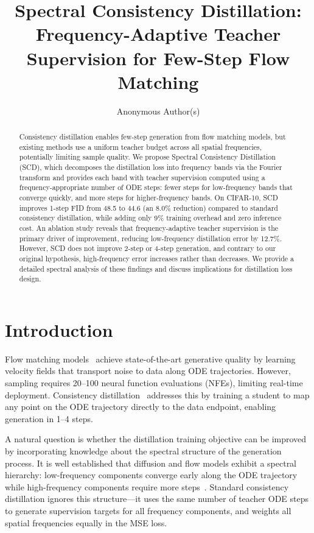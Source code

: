 \documentclass{article}
\title{Spectral Consistency Distillation: Frequency-Adaptive Teacher Supervision for Few-Step Flow Matching}
\author{
  Anonymous Author(s)
}
\newcommand{\scd}{\textsc{SCD}}
\begin{document}
\maketitle

\begin{abstract}
Consistency distillation enables few-step generation from flow matching models, but existing methods use a uniform teacher budget across all spatial frequencies, potentially limiting sample quality.
We propose Spectral Consistency Distillation (\scd{}), which decomposes the distillation loss into frequency bands via the Fourier transform and provides each band with teacher supervision computed using a frequency-appropriate number of ODE steps: fewer steps for low-frequency bands that converge quickly, and more steps for higher-frequency bands.
On CIFAR-10, \scd{} improves 1-step FID from 48.5 to 44.6 (an 8.0\% reduction) compared to standard consistency distillation, while adding only 9\% training overhead and zero inference cost.
An ablation study reveals that frequency-adaptive teacher supervision is the primary driver of improvement, reducing low-frequency distillation error by 12.7\%.
However, \scd{} does not improve 2-step or 4-step generation, and contrary to our original hypothesis, high-frequency error increases rather than decreases.
We provide a detailed spectral analysis of these findings and discuss implications for distillation loss design.
\end{abstract}

\section{Introduction}
\label{sec:intro}

Flow matching models~\citep{lipman2023flow, liu2023flow} achieve state-of-the-art generative quality by learning velocity fields that transport noise to data along ODE trajectories. However, sampling requires 20--100 neural function evaluations (NFEs), limiting real-time deployment.
Consistency distillation~\citep{song2023consistency, geng2024consistency} addresses this by training a student to map any point on the ODE trajectory directly to the data endpoint, enabling generation in 1--4 steps.

A natural question is whether the distillation training objective can be improved by incorporating knowledge about the spectral structure of the generation process.
It is well established that diffusion and flow models exhibit a spectral hierarchy: low-frequency components converge early along the ODE trajectory while high-frequency components require more steps~\citep{rissanen2023generative}.
Standard consistency distillation ignores this structure---it uses the same number of teacher ODE steps to generate supervision targets for all frequency components, and weights all spatial frequencies equally in the MSE loss.
\end{document}
